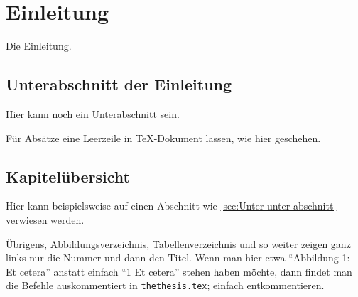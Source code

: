 \section{Einleitung}
Die Einleitung.


\subsection{Unterabschnitt der Einleitung}\label{sec:Unterabschnitt-einleitung}
Hier kann noch ein Unterabschnitt sein.

Für Absätze eine Leerzeile in TeX-Dokument lassen, wie hier geschehen.

\subsection{Kapitelübersicht}
Hier kann beispielsweise auf einen Abschnitt wie \cref{sec:Unter-unter-abschnitt} verwiesen werden.

Übrigens, Abbildungsverzeichnis, Tabellenverzeichnis und so weiter zeigen ganz
links nur die Nummer und dann den Titel. Wenn man hier etwa \enquote{Abbildung
1: Et cetera} anstatt einfach \enquote{1\hspace{2ex} Et cetera} stehen haben
möchte, dann findet man die Befehle auskommentiert in \texttt{thethesis.tex};
einfach entkommentieren.
